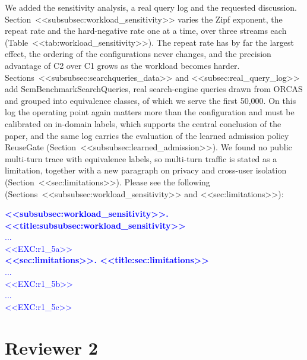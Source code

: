 \documentclass[11pt]{article}
\begin{document}
\begin{enumerate}[leftmargin=*, itemsep=1.2em]
We added the sensitivity analysis, a real query log and the requested discussion. Section~<<subsubsec:workload_sensitivity>> varies the Zipf exponent, the repeat rate and the hard-negative rate one at a time, over three streams each (Table~<<tab:workload_sensitivity>>). The repeat rate has by far the largest effect, the ordering of the configurations never changes, and the precision advantage of C2 over C1 grows as the workload becomes harder. Sections~<<subsubsec:searchqueries_data>> and <<subsec:real_query_log>> add SemBenchmarkSearchQueries, real search-engine queries drawn from ORCAS and grouped into equivalence classes, of which we serve the first 50,000. On this log the operating point again matters more than the configuration and must be calibrated on in-domain labels, which supports the central conclusion of the paper, and the same log carries the evaluation of the learned admission policy ReuseGate (Section~<<subsubsec:learned_admission>>). We found no public multi-turn trace with equivalence labels, so multi-turn traffic is stated as a limitation, together with a new paragraph on privacy and cross-user isolation (Section~<<sec:limitations>>). Please see the following (Sections~<<subsubsec:workload_sensitivity>> and <<sec:limitations>>):

\textcolor{blue}{\textbf{<<subsubsec:workload_sensitivity>>. <<title:subsubsec:workload_sensitivity>>}\\
...\\
<<EXC:r1_5a>>\\
\textbf{<<sec:limitations>>. <<title:sec:limitations>>}\\
...\\
<<EXC:r1_5b>>\\
...\\
<<EXC:r1_5c>>}

\end{enumerate}

\section*{Reviewer 2}
\end{document}
